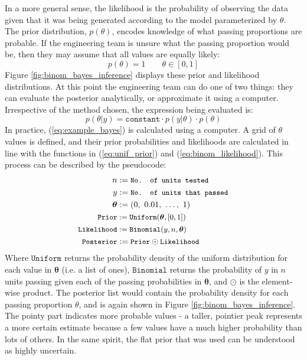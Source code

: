 \documentclass[11pt,a4paper,article]{memoir} %
\begin{document}
In a more general sense, the likelihood is the probability of observing the data given that it was being generated according to the model parameterized by $\theta$.
The prior distribution, $p(\theta)$, encodes knowledge of what passing proportions are probable. If the engineering team is unsure what the passing proportion would be, then they may assume that all values are equally likely:
\begin{equation}
  p(\theta) = 1 \qquad \theta \in [0, 1]
  \label{eq:unif_prior}
\end{equation}
Figure \ref{fig:binom_bayes_inference} displays these prior and likelihood distributions. At this point the engineering team can do one of two things: they can evaluate the posterior analytically, or approximate it using a computer. Irrespective of the method chosen, the expression being evaluated is:
\begin{equation}
	p(\theta|y) = \texttt{constant}\cdot p(y|\theta) \cdot p(\theta)
	\label{eq:example_bayes}
\end{equation}
In practice, (\ref{eq:example_bayes}) is calculated using a computer. A grid of $\theta$ values is defined, and their prior probabilities and likelihoods are calculated in line with the functions in (\ref{eq:unif_prior}) and (\ref{eq:binom_likelihood}). This process can be described by the pseudocode:
\begin{align*}
  \quad n &:= \small{\texttt{No. of units tested}} \\
   \quad y &:= \small{\texttt{No. of units that passed}} \\
  \boldsymbol{\theta} & := (0, \ 0.01, \ \dots, \ 1) \\
  \small{\texttt{Prior}} &:= \small{\texttt{Uniform}}(\boldsymbol{\theta}, [0, 1]) \\
  \small{\texttt{Likelihood}} &:= \small{\texttt{Binomial}}(y, n, \boldsymbol{\theta}) \\ 
  \small{\texttt{Posterior}} &:= \small{\texttt{Prior} \odot \texttt{Likelihood}}
\end{align*}
Where $\texttt{Uniform}$ returns the probability density of the uniform distribution for each value in $\boldsymbol{\theta}$ (i.e. a list of ones), $\texttt{Binomial}$ returns the probability of $y$ in $n$ units passing given each of the passing probabilities in $\boldsymbol{\theta}$, and $\odot$ is the element-wise product.
The posterior list would contain the probability density for each passing proportion $\theta$, and is again shown in Figure \ref{fig:binom_bayes_inference}. The pointy part indicates more probable values - a taller, pointier peak represents a more certain estimate because a few values have a much higher probability than lots of others. In the same spirit, the flat prior that was used can be understood as highly uncertain.
\end{document}
